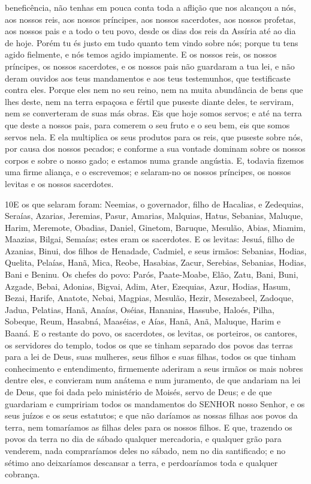 beneficência, não tenhas em pouca conta toda a aflição que nos
alcançou a nós, aos nossos reis, aos nossos príncipes, aos nossos
sacerdotes, aos nossos profetas, aos nossos pais e a todo o teu
povo, desde os dias dos reis da Assíria até ao dia de hoje.
Porém tu és justo em tudo quanto tem vindo sobre nós; porque
tu tens agido fielmente, e nós temos agido impiamente. E os
nossos reis, os nossos príncipes, os nossos sacerdotes, e os nossos
pais não guardaram a tua lei, e não deram ouvidos aos teus
mandamentos e aos teus testemunhos, que testificaste contra eles.
Porque eles nem no seu reino, nem na muita abundância de bens
que lhes deste, nem na terra espaçosa e fértil que puseste diante
deles, te serviram, nem se converteram de suas más obras. Eis
que hoje somos servos; e até na terra que deste a nossos pais, para
comerem o seu fruto e o seu bem, eis que somos servos nela. E
ela multiplica os seus produtos para os reis, que puseste sobre nós,
por causa dos nossos pecados; e conforme a sua vontade dominam sobre
os nossos corpos e sobre o nosso gado; e estamos numa grande
angústia. E, todavia fizemos uma firme aliança, e o
escrevemos; e selaram-no os nossos príncipes, os nossos levitas e os
nossos sacerdotes.

\medskip

\lettrine{10} E os que selaram foram: Neemias, o governador,
filho de Hacalias, e Zedequias, Seraías, Azarias, Jeremias,
Pasur, Amarias, Malquias, Hatus, Sebanias, Maluque,
Harim, Meremote, Obadias, Daniel, Ginetom, Baruque,
Mesulão, Abias, Miamim, Maazias, Bilgai, Semaías; estes eram
os sacerdotes. E os levitas: Jesuá, filho de Azanias, Binui, dos
filhos de Henadade, Cadmiel, e seus irmãos: Sebanias, Hodias,
Quelita, Pelaías, Hanã, Mica, Reobe, Hasabias, Zacur,
Serebias, Sebanias, Hodias, Bani e Beninu. Os chefes
do povo: Parós, Paate-Moabe, Elão, Zatu, Bani, Buni, Azgade,
Bebai, Adonias, Bigvai, Adim, Ater, Ezequias, Azur,
Hodias, Hasum, Bezai, Harife, Anatote, Nebai,
Magpias, Mesulão, Hezir, Mesezabeel, Zadoque, Jadua,
Pelatias, Hanã, Anaías, Oséias, Hananias, Hassube,
Haloés, Pilha, Sobeque, Reum, Hasabná, Maaséias,
e Aías, Hanã, Anã, Maluque, Harim e Baaná. E o
restante do povo, os sacerdotes, os levitas, os porteiros, os
cantores, os servidores do templo, todos os que se tinham separado
dos povos das terras para a lei de Deus, suas mulheres, seus filhos
e suas filhas, todos os que tinham conhecimento e entendimento,
firmemente aderiram a seus irmãos os mais nobres dentre eles,
e convieram num anátema e num juramento, de que andariam na lei de
Deus, que foi dada pelo ministério de Moisés, servo de Deus; e de
que guardariam e cumpririam todos os mandamentos do SENHOR nosso
Senhor, e os seus juízos e os seus estatutos; e que não
daríamos as nossas filhas aos povos da terra, nem tomaríamos as
filhas deles para os nossos filhos. E que, trazendo os povos
da terra no dia de sábado qualquer mercadoria, e qualquer grão para
venderem, nada compraríamos deles no sábado, nem no dia santificado;
e no sétimo ano deixaríamos descansar a terra, e perdoaríamos toda e
qualquer cobrança.

